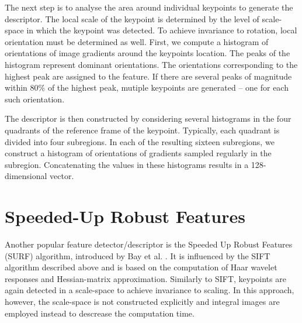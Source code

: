 The next step is to analyse the area around individual keypoints to generate the descriptor. 
The local scale of the keypoint is determined by the level of scale-space in which the keypoint was detected. 
To achieve invariance to rotation, local orientation must be determined as well. 
First, we compute a histogram of orientations of image gradients around the keypoints location.
The peaks of the histogram represent dominant orientations.
The orientations corresponding to the highest peak are assigned to the feature. 
If there are several peaks of magnitude within 80\% of the highest peak, mutiple keypoints are generated -- one for each such orientation.

The descriptor is then constructed by considering several histograms in the four quadrants of the reference frame of the keypoint. 
Typically, each quadrant is divided into four subregions. 
In each of the resulting sixteen subregions, we construct a histogram of orientations of gradients sampled regularly in the subregion. 
Concatenating the values in these histograms results in a 128-dimensional vector.

\section{Speeded-Up Robust Features}

Another popular feature detector/descriptor is the Speeded Up Robust Features (SURF) algorithm, introduced by Bay et al. \cite{surf2006}. 
It is influenced by the SIFT algorithm described above and is based on the computation of Haar wavelet responses and Hessian-matrix approximation. 
Similarly to SIFT, keypoints are again detected in a scale-space to achieve invariance to scaling. 
In this approach, however, the scale-space is not constructed explicitly and integral images are employed instead to descrease the computation time. %

